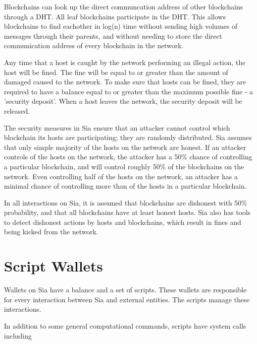 \documentclass[twocolumn]{article}
\begin{document}
Blockchains can look up the direct communcation address of other blockchains through a DHT.
All leaf blockchains participate in the DHT.
This allows blockchains to find eachother in log(n) time without sending high volumes of messages through their parents, and without needing to store the direct communication address of every blockchain in the network.

Any time that a host is caught by the network performing an illegal action, the host will be fined.
The fine will be equal to or greater than the amount of damaged caused to the network.
To make sure that hosts can be fined, they are required to have a balance equal to or greater than the maximum possible fine - a 'security deposit'.
When a host leaves the network, the security deposit will be released.

The security measures in Sia ensure that an attacker cannot control which blockchain its hosts are participating; they are randomly distributed.
Sia assumes that only simple majority of the hosts on the network are honest.
If an attacker controls \fortynine{} of the hosts on the network, the attacker has a 50\% chance of controlling a particular blockchain, and will control roughly 50\% of the blockchains on the network.
Even controlling half of the hosts on the network, an attacker has a minimal chance of controlling more than \maxcorruption{} of the hosts in a particular blockchain.

In all interactions on Sia, it is assumed that blockchains are dishonest with 50\% probability, and that all blockchains have at least \inversemaxcorruption{} honest hosts.
Sia also has tools to detect dishonest actions by hosts and blockchains, which result in fines and being kicked from the network.

\section{Script Wallets}

Wallets on Sia have a balance and a set of scripts.
These wallets are responsible for every interaction between Sia and external entities.
The scripts manage these interactions.

In addition to some general computational commands, scripts have system calls including
\end{document}
